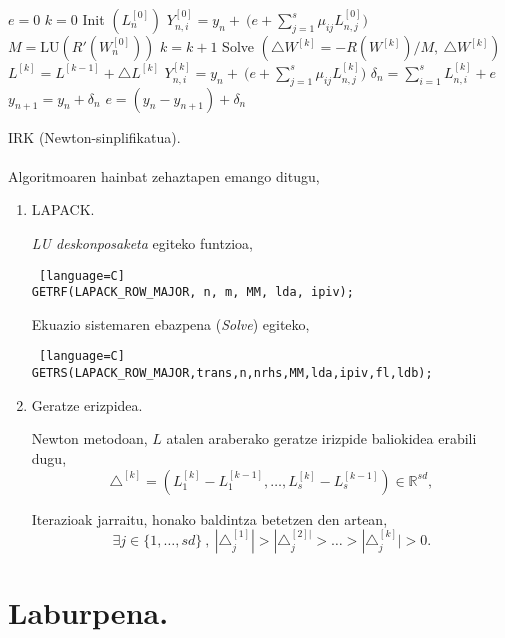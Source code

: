 \begin{algorithm}[h]
 \BlankLine
  $e=0$\;
  {
   \BlankLine
   $k=0$\;
   Init $(L_{n}^{[0]}) $\;
   $Y_{n,i}^{[0]}=y_{n} + \ \big(e+\sum\limits_{j=1}^{s} \mu_{ij} L_{n,j}^{[0]}\big)  $\;  
   \BlankLine
   $ M=\mbox{LU} (R'(W_{n}^{[0]})) $\;
   \BlankLine
   {
    \BlankLine 
    $k=k+1$\;
    Solve $(\triangle W^{[k]}=-R(W^{[k]})/M, \ \triangle W^{[k]})$\;
    $L^{[k]}=L^{[k-1]}+\triangle L^{[k]}$\;
    $Y_{n,i}^{[k]}=y_{n} + \ \big(e+\sum\limits_{j=1}^{s} \mu_{ij} L_{n,j}^{[k]}\big)  $\;  
   }
   \BlankLine
    $\delta_{n}= \sum\limits_{i=1}^{s} L_{n,i}^{[k]}+e $\;
    $y_{n+1}=y_{n}+ \delta_{n} $\;
    $e=(y_{n}-y_{n+1})+\delta_n$\;
   \BlankLine
 }
 \caption{IRK (Newton-sinplifikatua).}
\end{algorithm}


\paragraph*{} Algoritmoaren hainbat zehaztapen emango ditugu,

\begin{enumerate}

\item LAPACK.

\emph{LU deskonposaketa} egiteko funtzioa,
\begin{lstlisting} [language=C]
GETRF(LAPACK_ROW_MAJOR, n, m, MM, lda, ipiv);
\end{lstlisting}

Ekuazio sistemaren ebazpena (\emph{Solve}) egiteko,
\begin{lstlisting} [language=C]
GETRS(LAPACK_ROW_MAJOR,trans,n,nrhs,MM,lda,ipiv,fl,ldb);
\end{lstlisting}

\item Geratze erizpidea.

Newton metodoan, $L$ atalen araberako geratze irizpide baliokidea erabili dugu,
\begin{equation*}
\triangle^{[k]}=(L_1^{[k]}-L_1^{[k-1]},\dots,L_s^{[k]}-L_s^{[k-1]}) \in \mathbb{R}^{sd},
\end{equation*}

Iterazioak jarraitu, honako baldintza betetzen den artean,
\begin{equation}
\exists j \in \{1,\dots,sd\} \ , \ |\triangle_j^{[1]}| >|\triangle_j^{[2]|}>\dots>|\triangle_j^{[k]}|>0.
\end{equation} 

\end{enumerate}

\section{Laburpena.}
